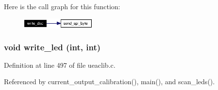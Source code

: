 Here is the call graph for this function:\begin{figure}[H]
\begin{center}
\leavevmode
\includegraphics[width=107pt]{ueaclib_8h_a12_cgraph}
\end{center}
\end{figure}
\subsubsection{\setlength{\rightskip}{0pt plus 5cm}void write\_\-led (int, int)}\label{ueaclib_8h_a14}




Definition at line 497 of file ueaclib.c.

Referenced by current\_\-output\_\-calibration(), main(), and scan\_\-leds().

